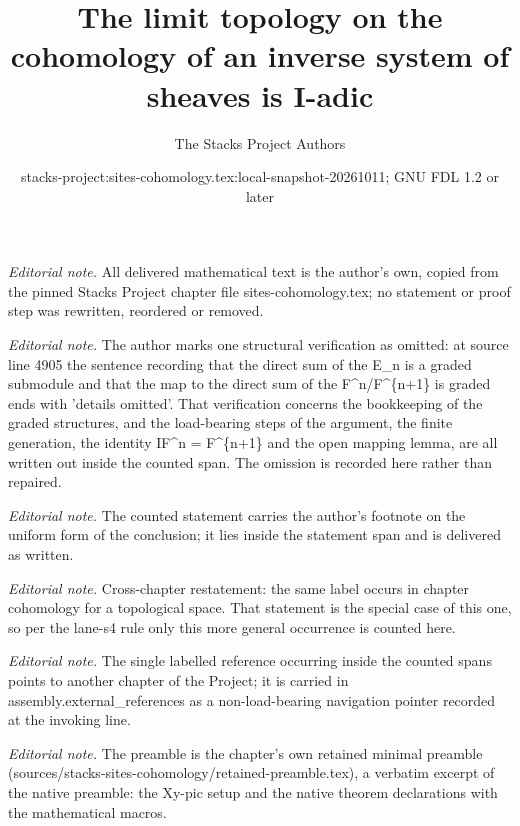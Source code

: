 \documentclass[10pt,a4paper]{amsart}
\title{The limit topology on the cohomology of an inverse system of sheaves is I-adic}
\author{The Stacks Project Authors}
\date{stacks-project:sites-cohomology.tex:local-snapshot-20261011; GNU FDL 1.2 or later}
\theoremstyle{plain}
\theoremstyle{definition}
\theoremstyle{remark}
\numberwithin{equation}{subsection}
\begin{document}
\maketitle
\noindent\textit{Editorial note.} All delivered mathematical text is the author's own, copied from the pinned Stacks Project chapter file sites-cohomology.tex; no statement or proof step was rewritten, reordered or removed.\par\medskip
\noindent\textit{Editorial note.} The author marks one structural verification as omitted: at source line 4905 the sentence recording that the direct sum of the E\_n is a graded submodule and that the map to the direct sum of the F\textasciicircum{}n/F\textasciicircum{}\{n+1\} is graded ends with 'details omitted'. That verification concerns the bookkeeping of the graded structures, and the load-bearing steps of the argument, the finite generation, the identity IF\textasciicircum{}n = F\textasciicircum{}\{n+1\} and the open mapping lemma, are all written out inside the counted span. The omission is recorded here rather than repaired.\par\medskip
\noindent\textit{Editorial note.} The counted statement carries the author's footnote on the uniform form of the conclusion; it lies inside the statement span and is delivered as written.\par\medskip
\noindent\textit{Editorial note.} Cross-chapter restatement: the same label occurs in chapter cohomology for a topological space. That statement is the special case of this one, so per the lane-s4 rule only this more general occurrence is counted here.\par\medskip
\noindent\textit{Editorial note.} The single labelled reference occurring inside the counted spans points to another chapter of the Project; it is carried in assembly.external\_references as a non-load-bearing navigation pointer recorded at the invoking line.\par\medskip
\noindent\textit{Editorial note.} The preamble is the chapter's own retained minimal preamble (sources/stacks-sites-cohomology/retained-preamble.tex), a verbatim excerpt of the native preamble: the Xy-pic setup and the native theorem declarations with the mathematical macros.\par\medskip
\end{document}
